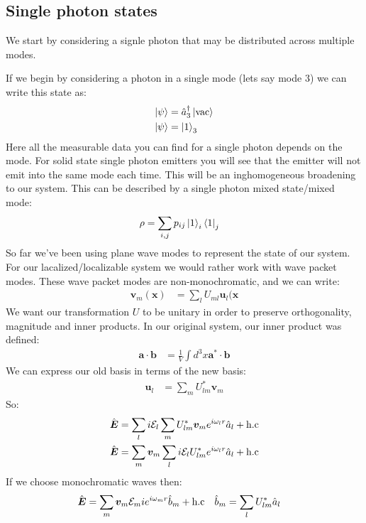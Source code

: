 \subsection{Single photon states}
We start by considering a signle photon that may be distributed across multiple modes. 

If we begin by considering a photon in a single mode (lets say mode $3$) we can write this state as:
\begin{align*}
	\ket{\psi} &= \hat{a}_3^\dagger\ket{\text{vac}} \\
	\ket{\psi} &= \ket{1}_3
\end{align*}
Here all the measurable data you can find for a single photon depends on the mode. For solid state single photon emitters you will see that the emitter will not emit into the same mode each time.
This will be an inghomogeneous broadening to our system. This can be described by a single photon mixed state/mixed mode:
\begin{align*}
	\rho &= \sum_{i,j} p_{ij}\ket{1}_i\bra{1}_j
\end{align*}
So far we've been using plane wave modes to represent the state of our system. For our lacalized/localizable system we would rather work with wave packet modes. These wave packet modes are non-monochromatic, and we can write:
\begin{align*}
	\bm{v}_m(\bm{x}) &= \sum_l U_{ml} \bm{u}_l(\bm{x}
\end{align*}
We want our transformation $U$ to be unitary in order to preserve orthogonality, magnitude and inner products. In our original system, our inner product was defined:
\begin{align*}
	\bm{a}\cdot\bm{b} &= \frac{1}{V} \int d^3 x \bm{a}^*\cdot\bm{b}
\end{align*}
We can express our old basis in terms of the new basis:
\begin{align*}
	\bm{u}_l  &= \sum_m U_{lm}^* \bm{v}_m
\end{align*}
So:
\begin{align*}
	\hat{\bm{E}} &= \sum_l i \mathcal{E}_l \sum_m U_{lm}^*\bm{v}_m e^{i\omega_l r} \hat{a}_l + \text{h.c} \\
	\hat{\bm{E}} &= \sum_m \bm{v}_m \sum_l i \mathcal{E}_l U_{lm}^* e^{i\omega_l r}\hat{a}_l + \text{h.c}
\end{align*}
If we choose monochromatic waves then:
\begin{align*}
	\hat{\bm{E}} &= \sum_m \bm{v}_m\mathcal{E}_mi e^{i\omega_m r}\hat{b}_m + \text{h.c} &
	\hat{b}_m &= \sum_l U_{lm}^* \hat{a}_l
\end{align*}
